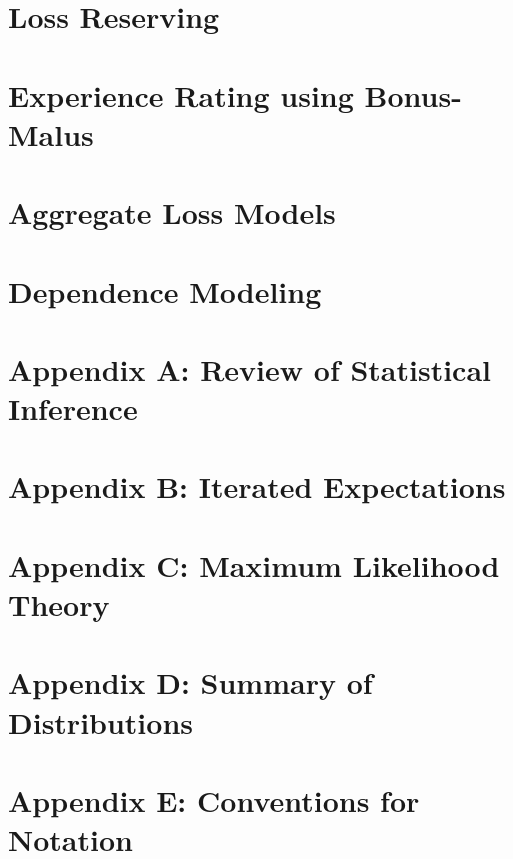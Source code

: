 \documentclass[
]{book}
\begin{document}
\hypertarget{loss-reserving}{%
\chapter{Loss Reserving}\label{loss-reserving}}

\hypertarget{experience-rating-using-bonus-malus}{%
\chapter{Experience Rating using Bonus-Malus}\label{experience-rating-using-bonus-malus}}

\hypertarget{aggregate-loss-models-1}{%
\chapter{Aggregate Loss Models}\label{aggregate-loss-models-1}}

\hypertarget{dependence-modeling}{%
\chapter{Dependence Modeling}\label{dependence-modeling}}

\hypertarget{appendix-a-review-of-statistical-inference}{%
\chapter{Appendix A: Review of Statistical Inference}\label{appendix-a-review-of-statistical-inference}}

\hypertarget{appendix-b-iterated-expectations}{%
\chapter{Appendix B: Iterated Expectations}\label{appendix-b-iterated-expectations}}

\hypertarget{appendix-c-maximum-likelihood-theory}{%
\chapter{Appendix C: Maximum Likelihood Theory}\label{appendix-c-maximum-likelihood-theory}}

\hypertarget{appendix-d-summary-of-distributions}{%
\chapter{Appendix D: Summary of Distributions}\label{appendix-d-summary-of-distributions}}

\hypertarget{appendix-e-conventions-for-notation}{%
\chapter{Appendix E: Conventions for Notation}\label{appendix-e-conventions-for-notation}}

\hypertarget{section}{%
\chapter*{}\label{section}}
\end{document}
